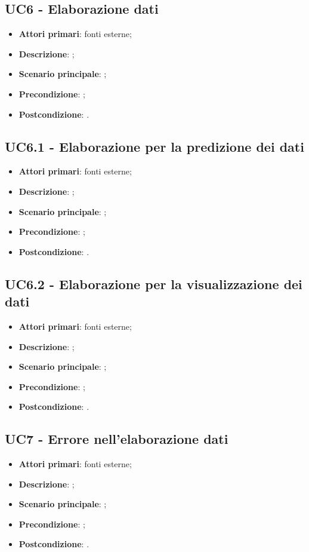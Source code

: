 \subsection{UC6 - Elaborazione dati}
\begin{itemize}
	\item \textbf{Attori primari}: fonti esterne;
	\item \textbf{Descrizione}: ;
	\item \textbf{Scenario principale}: ;
	\item \textbf{Precondizione}: ;
	\item \textbf{Postcondizione}: .
\end{itemize}

\subsection{UC6.1 - Elaborazione per la predizione dei dati}
\begin{itemize}
	\item \textbf{Attori primari}: fonti esterne;
	\item \textbf{Descrizione}: ;
	\item \textbf{Scenario principale}: ;
	\item \textbf{Precondizione}: ;
	\item \textbf{Postcondizione}: .
\end{itemize}

\subsection{UC6.2 - Elaborazione per la visualizzazione dei dati}
\begin{itemize}
	\item \textbf{Attori primari}: fonti esterne;
	\item \textbf{Descrizione}: ;
	\item \textbf{Scenario principale}: ;
	\item \textbf{Precondizione}: ;
	\item \textbf{Postcondizione}: .
\end{itemize}

\subsection{UC7 - Errore nell'elaborazione dati}
\begin{itemize}
	\item \textbf{Attori primari}: fonti esterne;
	\item \textbf{Descrizione}: ;
	\item \textbf{Scenario principale}: ;
	\item \textbf{Precondizione}: ;
	\item \textbf{Postcondizione}: .
\end{itemize}


